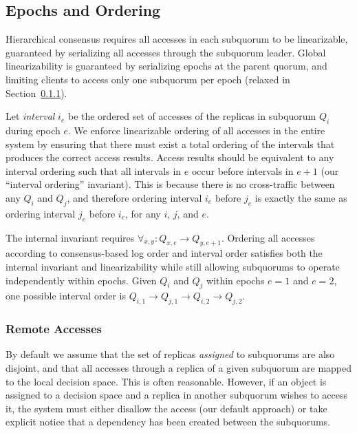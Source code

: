 \documentclass[sigconf]{acmart}
\begin{document}
\subsection{Epochs and Ordering}

Hierarchical consensus requires all accesses in each subquorum to be linearizable,
guaranteed by serializing all accesses through the subquorum leader.
Global linearizability is guaranteed by serializing epochs at the parent
quorum, and limiting clients to access only one subquorum per epoch (relaxed
in Section~\ref{sec:remote}).

Let \emph{interval} $i_e$ be the ordered set of accesses of the replicas in subquorum
$Q_i$ during epoch $e$.
We enforce linearizable ordering of all accesses in the entire system by
ensuring that there must exist a total ordering of the intervals that produces the correct
access results.
Access results should be equivalent to any interval ordering
such that all intervals in $e$ occur before intervals in $e+1$ (our ``interval
ordering'' invariant).
This is because there is no cross-traffic between any $Q_i$ and $Q_j$, and therefore
ordering interval $i_e$ before $j_e$ is exactly the same as ordering interval $j_e$
before $i_e$, for any $i$, $j$, and $e$.

The internal invariant requires $\forall_{x,y} : Q_{x,e} \rightarrow Q_{y,e+1}$.
Ordering all accesses according to consensus-based log order and interval order satisfies both the
internal invariant and linearizability  while still allowing subquorums to operate
independently within epochs.
Given $Q_i$ and $Q_j$ within epochs $e=1$ and $e=2$, one possible interval order is
$Q_{i,1} \rightarrow Q_{j,1} \rightarrow Q_{i,2} \rightarrow Q_{j,2}$.

\subsubsection{Remote Accesses}
\label{sec:remote}

By default we assume that the set of replicas \emph{assigned} to subquorums are also
disjoint, and that all accesses through a replica of a given subquorum are mapped to the
local decision space.
This is often reasonable.
However, if an object is assigned to a decision space and a replica in another subquorum
wishes to
access it, the system must either disallow the access (our default approach) or take
explicit notice that a dependency has been created between the subquorums.
\end{document}
